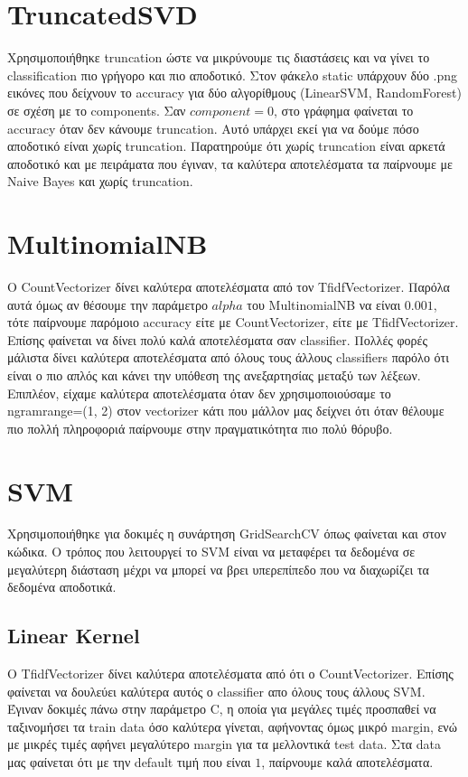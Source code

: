 \documentclass[a4paper,12pt]{article}
\begin{document}
    \section*{TruncatedSVD}
        Χρησιμοποιήθηκε truncation ώστε να μικρύνουμε τις διαστάσεις και να γίνει το classification πιο γρήγορο
        και πιο αποδοτικό. Στον φάκελο static υπάρχουν δύο .png εικόνες που δείχνουν το accuracy για δύο αλγορίθμους
        (LinearSVM, RandomForest) σε σχέση με το components. Σαν $component=0$, στο γράφημα φαίνεται το accuracy όταν
        δεν κάνουμε truncation. Αυτό υπάρχει εκεί για να δούμε πόσο αποδοτικό είναι χωρίς truncation. Παρατηρούμε ότι χωρίς
        truncation είναι αρκετά αποδοτικό και με πειράματα που έγιναν, τα καλύτερα αποτελέσματα τα παίρνουμε με
        Naive Bayes και χωρίς truncation.
        
    \section*{MultinomialNB}  
        Ο CountVectorizer δίνει καλύτερα αποτελέσματα από τον TfidfVectorizer. Παρόλα αυτά όμως αν θέσουμε την παράμετρο
        $alpha$ του MultinomialNB να είναι $0.001$, τότε παίρνουμε παρόμοιο accuracy είτε με CountVectorizer, είτε με
        TfidfVectorizer. Επίσης φαίνεται να δίνει πολύ καλά αποτελέσματα σαν classifier. Πολλές φορές μάλιστα δίνει καλύτερα 
        αποτελέσματα από όλους τους άλλους classifiers παρόλο ότι είναι ο πιο απλός και κάνει την υπόθεση της ανεξαρτησίας μεταξύ των 
        λέξεων. Επιπλέον, είχαμε καλύτερα αποτελέσματα όταν δεν χρησιμοποιούσαμε το ngram\textunderscore range=(1, 2) στον 
        vectorizer κάτι που μάλλον μας δείχνει ότι όταν θέλουμε πιο πολλή πληροφοριά παίρνουμε στην πραγματικότητα πιο πολύ θόρυβο.

    \section*{SVM}
        Χρησιμοποιήθηκε για δοκιμές η συνάρτηση GridSearchCV όπως φαίνεται και στον κώδικα. Ο τρόπος που λειτουργεί το SVM είναι 
        να μεταφέρει τα δεδομένα σε μεγαλύτερη διάσταση μέχρι να μπορεί να βρει υπερεπίπεδο που να διαχωρίζει τα δεδομένα αποδοτικά.

        \subsection*{Linear Kernel}
            Ο TfidfVectorizer δίνει καλύτερα αποτελέσματα από ότι ο CountVectorizer. Επίσης φαίνεται να δουλεύει
            καλύτερα αυτός ο classifier απο όλους τους άλλους SVM.  Έγιναν δοκιμές πάνω στην παράμετρο C, η οποία για 
            μεγάλες τιμές προσπαθεί να ταξινομήσει τα train data όσο καλύτερα γίνεται, αφήνοντας όμως μικρό margin, ενώ με 
            μικρές τιμές αφήνει μεγαλύτερο margin για τα μελλοντικά test data. Στα data μας φαίνεται ότι με την default 
            τιμή που είναι $1$, παίρνουμε καλά αποτελέσματα.
\end{document}
